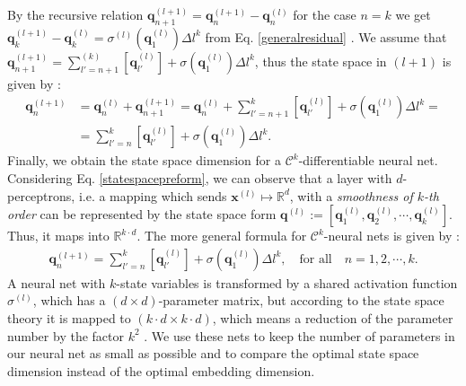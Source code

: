 \documentclass[envcountsect,runningheads]{llncs}
\begin{document}
By the recursive relation $\textbf{q}_{n+1}^{(l+1)} = \textbf{q}_n^{(l+1)} - \textbf{q}_n^{(l)}$ for the case $n = k$ we get $\textbf{q}_k^{(l+1)} - \textbf{q}_k^{(l)} = \sigma^{(l)} \left( \textbf{q}_1^{(l)}\right) \Delta l^k$ from Eq. \ref{generalresidual} . We assume that $\textbf{q}_{n+1}^{(l+1)} = \sum_{l'=n+1}^{(k)} [\textbf{q}_{l'}^{(l)}] + \sigma\left( \textbf{q}_1^{(l)} \right) \Delta l^k$, thus the state space in $(l+1)$ is given by :
\begin{align}
	\label{statespacepreform}
	\textbf{q}_n^{(l+1)} &= \textbf{q}_n^{(l)} + \textbf{q}_{n+1}^{(l+1)} = \textbf{q}_n^{(l)} + \sum_{l'=n+1}^k \left[\textbf{q}_{l'}^{(l)}\right] + \sigma\left( \textbf{q}_1^{(l)} \right) \Delta l^k = \\
	&= \sum_{l'=n}^k \left[\textbf{q}_{l'}^{(l)}\right] + \sigma\left( \textbf{q}_1^{(l)} \right) \Delta l^k.
\end{align}
Finally, we obtain the state space dimension for a $\mathcal{C}^k$-differentiable neural net. Considering Eq. \ref{statespacepreform}, we can observe that a layer with $d$-perceptrons, i.e. a mapping which sends $\textbf{x}^{(l)} \mapsto \mathbb{R}^d$, with a \textit{smoothness of $k$-th order} can be represented by the state space form $\textbf{q}^{(l)} := [\textbf{q}_1^{(l)},\textbf{q}_2^{(l)},\cdots,\textbf{q}_k^{(l)}]$. Thus, it maps into $\mathbb{R}^{k\cdot d}$. The more general formula for $\mathcal{C}^k$-neural nets is given by :
\begin{align}
	\label{statespace}
	\textbf{q}_n^{(l+1)} = \sum_{l'=n}^{k} \left[\textbf{q}_{l'}^{(l)}\right] + \sigma\left( \textbf{q}_1^{(l)} \right) \Delta l^k, \quad \text{for all} \quad n = 1,2, \cdots, k.
\end{align}
A neural net with $k$-state variables is transformed by a shared activation function $\sigma^{(l)}$, which has a $(d\times d)$-parameter matrix, but according to the state space theory it is mapped to $(k\cdot d \times k \cdot d)$, which means a reduction of the parameter number by the factor $k^2$ . We use these nets to keep the number of parameters in our neural net as small as possible and to compare the optimal state space dimension instead of the optimal embedding dimension.
\end{document}
